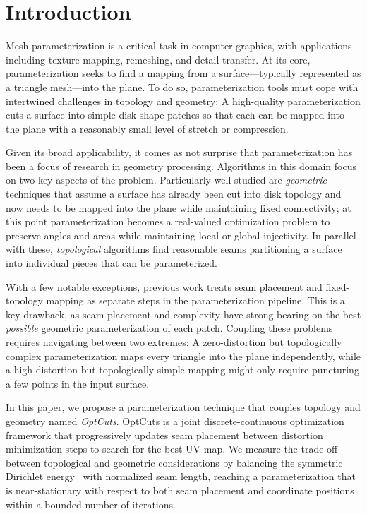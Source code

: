 
\section{Introduction}

Mesh parameterization is a critical task in computer graphics, with applications including texture mapping, remeshing, and detail transfer.  At its core, parameterization seeks to find a mapping from a surface---typically represented as a triangle mesh---into the plane.  To do so, parameterization tools must cope with intertwined challenges in topology and geometry:  A high-quality parameterization cuts a surface into simple disk-shape patches so that each can be mapped into the plane with a reasonably small level of stretch or compression.

Given its broad applicability, it comes as not surprise that parameterization has been a focus of research in geometry processing.  Algorithms in this domain focus on two key aspects of the problem.  Particularly well-studied are \emph{geometric} techniques that assume a surface has already been cut into disk topology and now needs to be mapped into the plane while maintaining fixed connectivity; at this point parameterization becomes a real-valued optimization problem to preserve angles and areas while maintaining local or global injectivity.  In parallel with these, \emph{topological} algorithms find reasonable seams partitioning a surface into individual pieces that can be parameterized.  

With a few notable exceptions, previous work treats seam placement and fixed-topology mapping as separate steps in the parameterization pipeline.  This is a key drawback, as seam placement and complexity have strong bearing on the best \emph{possible} geometric parameterization of each patch.  Coupling these problems requires navigating between two extremes:  A zero-distortion but topologically complex parameterization maps every triangle into the plane independently, while a high-distortion but topologically simple mapping might only require puncturing a few points in the input surface.

In this paper, we propose a parameterization technique that couples topology and geometry named 
{\em OptCuts}.
OptCuts is 
a joint discrete-continuous optimization framework that progressively updates seam placement between distortion minimization steps to search for the best UV map. 
%
We measure the trade-off between topological and geometric considerations by balancing the symmetric Dirichlet energy~\cite{Smith2015Bijective} with normalized seam length, reaching a parameterization that is near-stationary with respect to both seam placement and coordinate positions within a bounded number of iterations.

